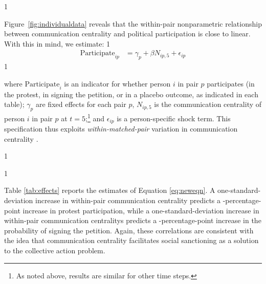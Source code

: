 \documentclass[12pt]{article}
\newcommand{\StepCountInFileNames}{6}
\newcommand{\StepCountInText}{5} %
\newcommand{\jop}{0} %
\begin{document}
	\if\jop1
	\linespread{2}\selectfont
	\fi





Figure~\ref{fig:individualdata} reveals that the within-pair nonparametric relationship between communication centrality and political participation is close to linear. With this in mind, we estimate:
\if\jop1
\vspace{-.5cm}
\fi
\begin{align}\label{eq:neweqn}
\text{Participate}_{ip} & = \gamma_{p} + \beta N_{ip,\StepCountInText} + \epsilon_{ip}
\end{align}
\if\jop1
\vspace{-1.5cm}
\fi

\noindent where $\text{Participate}_i$ is an indicator for whether person $i$ in pair $p$ participates (in the protest, in signing the petition, or in a placebo outcome, as indicated in each table); $\gamma_{p}$ are fixed effects for each pair $p$, $N_{ip,\StepCountInText}$ is the communication centrality of person $i$ in pair $p$ at $t=\StepCountInText$;\footnote{As noted above, results are similar for other time steps.%
} and $\epsilon_{ip}$ is a person-specific shock term. This specification thus exploits \emph{within-matched-pair} variation in communication centrality \citep[][]{MummoloPeterson}.





	\if\jop1
	\linespread{1}\selectfont
	\fi

	

	\if\jop1
	\linespread{2}\selectfont
	\fi


Table \ref{tab:effects} reports the estimates of Equation \ref{eq:neweqn}. A one-standard-deviation increase in within-pair communication centrality predicts a \unskip-percentage-point increase in protest participation, while a one-standard-deviation increase in within-pair communication centralitys predicts a \unskip-percentage-point increase in the probability of signing the petition. Again, these correlations are consistent with the idea that communication centrality facilitates social sanctioning as a solution to the collective action problem.
\end{document}
